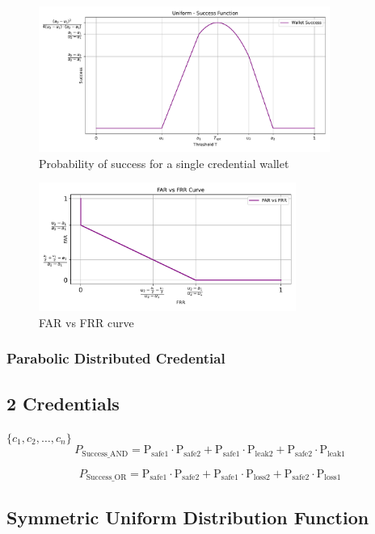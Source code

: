 \documentclass{article}
\begin{document}
\begin{figure}[H]
    \centering
    \includegraphics[width=0.85\textwidth]{fig_success_uniform.pdf}
    \caption{Probability of success for a single credential wallet}
\end{figure}
\begin{figure}[H]
    \centering
    \includegraphics[width=0.75\textwidth]{fig_FARvFRR_uniform.pdf}
    \caption{FAR vs FRR curve}
\end{figure}

\subsubsection{Parabolic Distributed Credential}

\subsection{2 Credentials}
$\{c_1, c_2, \ldots, c_n\}$
\[
P_{\text{Success\_AND}} = \mathrm{P_{\text{safe1}}} \cdot \mathrm{P_{\text{safe2}}} + \mathrm{P_{\text{safe1}}} \cdot \mathrm{P_{\text{leak2}}} + \mathrm{P_{\text{safe2}}} \cdot \mathrm{P_{\text{leak1}}}
\]

\[
P_{\text{Success\_OR}} = \mathrm{P_{\text{safe1}}} \cdot \mathrm{P_{\text{safe2}}} + \mathrm{P_{\text{safe1}}} \cdot \mathrm{P_{\text{loss2}}} + \mathrm{P_{\text{safe2}}} \cdot \mathrm{P_{\text{loss1}}}
\]
\subsection{Symmetric Uniform Distribution Function}
\end{document}
